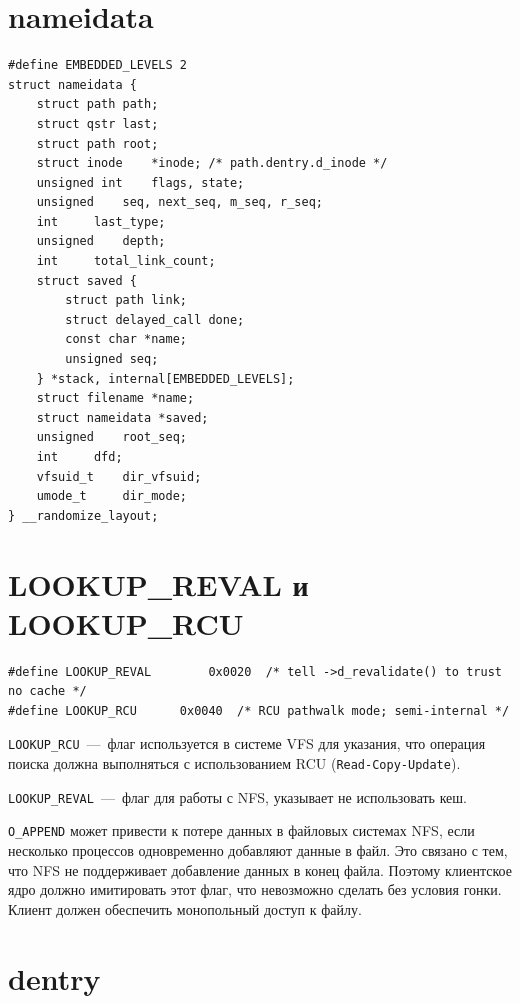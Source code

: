 \section{nameidata}

\begin{lstlisting}
#define EMBEDDED_LEVELS 2
struct nameidata {
	struct path	path;
	struct qstr	last;
	struct path	root;
	struct inode	*inode; /* path.dentry.d_inode */
	unsigned int	flags, state;
	unsigned	seq, next_seq, m_seq, r_seq;
	int		last_type;
	unsigned	depth;
	int		total_link_count;
	struct saved {
		struct path link;
		struct delayed_call done;
		const char *name;
		unsigned seq;
	} *stack, internal[EMBEDDED_LEVELS];
	struct filename	*name;
	struct nameidata *saved;
	unsigned	root_seq;
	int		dfd;
	vfsuid_t	dir_vfsuid;
	umode_t		dir_mode;
} __randomize_layout;

\end{lstlisting}

\section{LOOKUP\_REVAL и LOOKUP\_RCU}

\begin{lstlisting}
#define LOOKUP_REVAL		0x0020	/* tell ->d_revalidate() to trust no cache */
#define LOOKUP_RCU		0x0040	/* RCU pathwalk mode; semi-internal */
\end{lstlisting}

\texttt{LOOKUP\_RCU}~---~флаг используется в системе VFS для указания, что операция поиска должна выполняться с использованием RCU (\texttt{Read-Copy-Update}).
 
\texttt{LOOKUP\_REVAL}~---~флаг для работы с NFS, указывает не использовать кеш.

\texttt{O\_APPEND} может привести к потере данных в файловых системах NFS, если несколько процессов одновременно добавляют данные в файл. Это связано с тем, что NFS не поддерживает добавление данных в конец файла. Поэтому клиентское ядро должно имитировать этот флаг, что невозможно сделать без условия гонки. Клиент должен обеспечить монопольный доступ к файлу.

\section{dentry}

